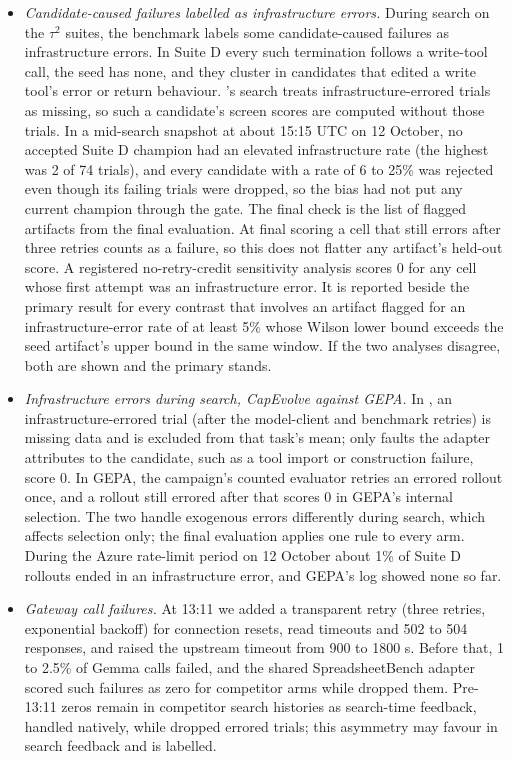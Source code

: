 \begin{itemize}[leftmargin=*,nosep]
\item \emph{Candidate-caused failures labelled as infrastructure errors.} During search on the $\tau^2$ suites, the benchmark labels some candidate-caused failures as infrastructure errors. In Suite D every such termination follows a write-tool call, the seed has none, and they cluster in candidates that edited a write tool's error or return behaviour. \capevolve{}'s search treats infrastructure-errored trials as missing, so such a candidate's screen scores are computed without those trials. In a mid-search snapshot at about 15:15 UTC on 12 October, no accepted Suite D champion had an elevated infrastructure rate (the highest was 2 of 74 trials), and every candidate with a rate of 6 to 25\% was rejected even though its failing trials were dropped, so the bias had not put any current champion through the gate. The final check is the list of flagged artifacts from the final evaluation. At final scoring a cell that still errors after three retries counts as a failure, so this does not flatter any artifact's held-out score. A registered no-retry-credit sensitivity analysis scores 0 for any cell whose first attempt was an infrastructure error. It is reported beside the primary result for every contrast that involves an artifact flagged for an infrastructure-error rate of at least 5\% whose Wilson lower bound exceeds the seed artifact's upper bound in the same window. If the two analyses disagree, both are shown and the primary stands. 
\item \emph{Infrastructure errors during search, CapEvolve against GEPA.} In \capevolve{}, an infrastructure-errored trial (after the model-client and benchmark retries) is missing data and is excluded from that task's mean; only faults the adapter attributes to the candidate, such as a tool import or construction failure, score 0. In GEPA, the campaign's counted evaluator retries an errored rollout once, and a rollout still errored after that scores 0 in GEPA's internal selection. The two handle exogenous errors differently during search, which affects selection only; the final evaluation applies one rule to every arm. During the Azure rate-limit period on 12 October about 1\% of Suite D rollouts ended in an infrastructure error, and GEPA's log showed none so far.
\item \emph{Gateway call failures.} At 13:11 we added a transparent retry (three retries, exponential backoff) for connection resets, read timeouts and 502 to 504 responses, and raised the upstream timeout from 900 to 1800 s. Before that, 1 to 2.5\% of Gemma calls failed, and the shared SpreadsheetBench adapter scored such failures as zero for competitor arms while \capevolve{} dropped them. Pre-13:11 zeros remain in competitor search histories as search-time feedback, handled natively, while \capevolve{} dropped errored trials; this asymmetry may favour \capevolve{} in search feedback and is labelled.

\end{itemize}
